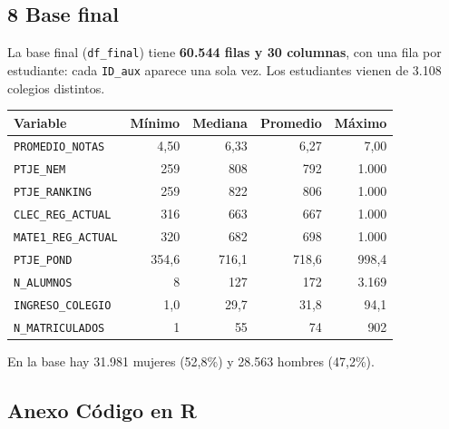 \documentclass[11pt]{article}
\begin{document}
\subsection*{8 \; Base final}

La base final (\texttt{df\_final}) tiene \textbf{60.544 filas y 30
columnas}, con una fila por estudiante: cada \texttt{ID\_aux} aparece una
sola vez. Los estudiantes vienen de 3.108 colegios distintos.

\begin{center}
\begin{tabular}{lrrrr}
\toprule
\textbf{Variable} & \textbf{Mínimo} & \textbf{Mediana} & \textbf{Promedio} & \textbf{Máximo} \\
\midrule
\texttt{PROMEDIO\_NOTAS}   & 4,50  & 6,33  & 6,27  & 7,00 \\
\texttt{PTJE\_NEM}         & 259   & 808   & 792   & 1.000 \\
\texttt{PTJE\_RANKING}     & 259   & 822   & 806   & 1.000 \\
\texttt{CLEC\_REG\_ACTUAL} & 316   & 663   & 667   & 1.000 \\
\texttt{MATE1\_REG\_ACTUAL}& 320   & 682   & 698   & 1.000 \\
\texttt{PTJE\_POND}        & 354,6 & 716,1 & 718,6 & 998,4 \\
\texttt{N\_ALUMNOS}        & 8     & 127   & 172   & 3.169 \\
\texttt{INGRESO\_COLEGIO}  & 1,0   & 29,7  & 31,8  & 94,1 \\
\texttt{N\_MATRICULADOS}   & 1     & 55    & 74    & 902 \\
\bottomrule
\end{tabular}
\end{center}

En la base hay 31.981 mujeres (52,8\%) y 28.563 hombres (47,2\%).

\newpage
\subsection*{Anexo \; Código en R}
\end{document}
